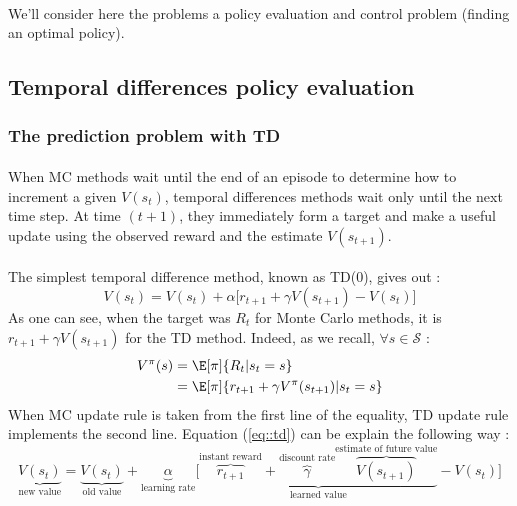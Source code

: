 \documentclass[a4paper]{article}
\begin{document}
{{			\paragraph{} We'll consider here the problems a policy evaluation and control problem (finding an optimal policy). 
			
			\subsection{Temporal differences policy evaluation}
			{
				\subsubsection{The prediction problem with TD}
				{
				\paragraph{} When MC methods wait until the end of an episode to determine how to increment a given $V(s_t)$, temporal differences methods wait only until the next time step. At time $(t+1)$, they immediately form a target and make a useful update using the observed reward and the estimate $V(s_{t+1})$. 
				
				\paragraph{} The simplest temporal difference method, known as TD(0), gives out : 
				\begin{equation}
					\label{eq::td}
					V(s_t) = V(s_t) + \alpha \big [ r_{t+1} + \gamma V(s_{t+1}) - V(s_t)\big]
				\end{equation}
				As one can see, when the target was $R_t$ for Monte Carlo methods, it is $r_{t+1} + \gamma V(s_{t+1})$ for the TD method. Indeed, as we recall, $\forall s \in\mathcal{S}$ : 
				\begin{equation}
					\begin{aligned}
						V^\pi(s) &= \E[\pi]{R_t \vert s_t=s} \\
							     &= \E[\pi]{r_{t+1} + \gamma V^\pi(s_{t+1}) \vert s_t =s }
					\end{aligned}
				\end{equation}
				When MC update rule is taken from the first line of the equality, TD update rule implements the second line. Equation (\ref{eq::td}) can be explain the following way : 
				\begin{equation}
					\underbrace{V(s_t)}_{\text{new value}} = \underbrace{V(s_t)}_{\text{old value}}+ \underbrace{\alpha}_{\text{learning rate}} \big [ \underbrace{\overbrace{r_{t+1}}^{\text{instant reward}} + \overbrace{\gamma}^{\text{discount rate}} \overbrace{V(s_{t+1})}^{\text{estimate of future value}}}_{\text{learned value}} - V(s_t)\big]
				\end{equation}
				
}}}}
\end{document}
